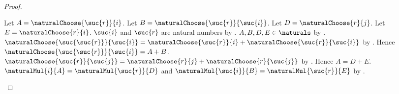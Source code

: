 \begin{proof}
\begin{subproof}
\begin{subproof}
\begin{byCase}
\begin{byCase}
                            Let $A=\naturalChoose{\suc{r}}{i}$.
                            Let $B=\naturalChoose{\suc{r}}{\suc{i}}$.
                            Let $D=\naturalChoose{r}{j}$.
                            Let $E=\naturalChoose{r}{i}$.
                            $\suc{i}$ and $\suc{r}$ are natural numbers by
                                .
                            $A,B,D,E\in\naturals$ by
                                .
                            $\naturalChoose{\suc{\suc{r}}}{\suc{i}}
                                =\naturalChoose{\suc{r}}{i}
                                    +\naturalChoose{\suc{r}}{\suc{i}}$ by
                                .
                            Hence $\naturalChoose{\suc{\suc{r}}}{\suc{i}}
                                =A+B$.
                            $\naturalChoose{\suc{r}}{\suc{j}}
                                =\naturalChoose{r}{j}
                                    +\naturalChoose{r}{\suc{j}}$ by
                                .
                            Hence $A=D+E$.
                            $\naturalMul{i}{A}
                                =\naturalMul{\suc{r}}{D}$ and
                                $\naturalMul{\suc{i}}{B}
                                    =\naturalMul{\suc{r}}{E}$ by
                                \auto.


\end{byCase}
\end{byCase}
\end{subproof}
\end{subproof}
\end{proof}
